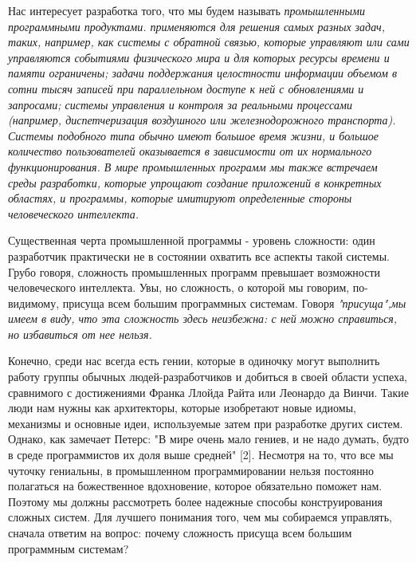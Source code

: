 \documentclass[11pt]{article}
\begin{document}
Нас интересует разработка того, что мы будем называть \it промышленными программными продуктами.  применяются для решения самых разных задач, таких, например, как системы с обратной связью, которые управляют или сами управляются событиями физического мира и для которых ресурсы времени и памяти ограничены; задачи поддержания целостности информации объемом в сотни тысяч записей при параллельном доступе к ней с обновлениями и запросами; системы управления и контроля за реальными процессами (например, диспетчеризация воздушного или железнодорожного транспорта). Системы подобного типа обычно имеют большое время жизни, и большое количество пользователей оказывается в зависимости от их нормального функционирования. В мире промышленных программ мы также встречаем среды разработки, которые упрощают создание приложений в конкретных областях, и программы, которые имитируют определенные стороны человеческого интеллекта. \bigskip

Существенная черта промышленной программы - уровень сложности: один разработчик практически не в состоянии охватить все аспекты такой системы. Грубо говоря, сложность промышленных программ превышает возможности человеческого интеллекта. Увы, но сложность, о которой мы говорим, по-видимому, присуща всем большим программных системам. Говоря \it"присуща",\rm мы имеем в виду, что эта сложность здесь неизбежна: с ней можно справиться, но избавиться от нее нельзя. \bigskip

Конечно, среди нас всегда есть гении, которые в одиночку могут выполнить работу группы обычных людей-разработчиков и добиться в своей области успеха, сравнимого с достижениями Франка Ллойда Райта или Леонардо да Винчи. Такие люди нам нужны как архитекторы, которые изобретают новые идиомы, механизмы и основные идеи, используемые затем при разработке других систем. Однако, как замечает Петерс: "В мире очень мало гениев, и не надо думать, будто в среде программистов их доля выше средней" [2]. Несмотря на то, что все мы чуточку гениальны, в промышленном программировании нельзя постоянно полагаться на божественное вдохновение, которое обязательно поможет нам. Поэтому мы должны рассмотреть более надежные способы конструирования сложных систем. Для лучшего понимания того, чем мы собираемся управлять, сначала ответим на вопрос: почему сложность присуща всем большим программным системам? 
\end{document}
